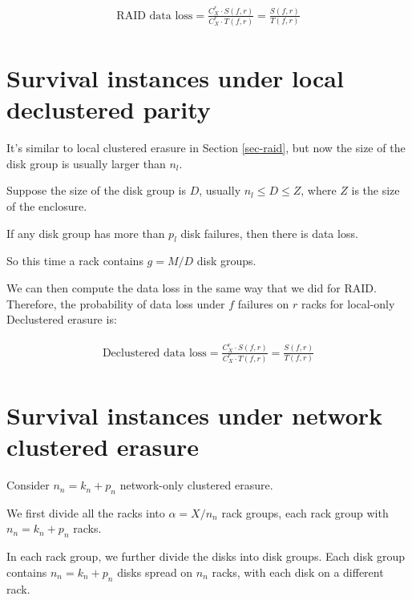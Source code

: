 \documentclass{article}
\begin{document}
\begin{eqnarray}
\begin{aligned}
\text{RAID data loss} = \frac{C_{X}^{r} \cdot S(f,r)} 
{C_{X}^{r} \cdot T(f,r)}
= \frac{ S(f,r)} { T(f,r)}
\end{aligned}
\label{eq:raid:6}
\end{eqnarray}



\section{Survival instances under local declustered parity}

It's similar to local clustered erasure in Section \ref{sec-raid}, but now the size of the disk group is usually larger than $n_l$. 

Suppose the size of the disk group is $D$, usually $n_l \leq D \leq Z$, where $Z$ is the size of the enclosure.

If any disk group has more than $p_l$ disk failures, then there is data loss.

So this time a rack contains $g = M/D$ disk groups.

We can then compute the data loss in the same way that we did for RAID. Therefore, the probability of data loss under $f$ failures on $r$ racks for local-only Declustered erasure is:

\begin{eqnarray}
\begin{aligned}
\text{Declustered data loss} = \frac{C_{X}^{r} \cdot S(f,r)} 
{C_{X}^{r} \cdot T(f,r)}
= \frac{ S(f,r)} { T(f,r)}
\end{aligned}
\label{eq:dp:1}
\end{eqnarray}




\section{Survival instances under network clustered erasure}

Consider $n_n=k_n+p_n$ network-only clustered erasure.

We first divide all the racks into $\alpha = X / n_n$ rack groups, each rack group with $n_n=k_n+p_n$ racks.

In each rack group, we further divide the disks into disk groups. Each disk group contains $n_n=k_n+p_n$ disks spread on $n_n$ racks, with each disk on a different rack.
\end{document}
